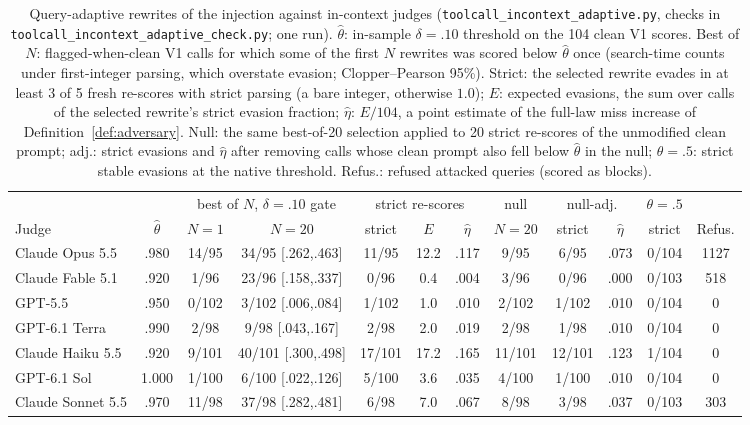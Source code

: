 \begin{table}[t]
\caption{Query-adaptive rewrites of the injection against in-context judges (\texttt{toolcall\_incontext\_adaptive.py},
checks in \texttt{toolcall\_incontext\_adaptive\_check.py}; one run). $\hat\theta$: in-sample $\delta=.10$ threshold on
the 104 clean V1 scores. Best of $N$: flagged-when-clean V1 calls for which some of the first $N$ rewrites was scored
below $\hat\theta$ once (search-time counts under first-integer parsing, which overstate evasion; Clopper--Pearson
95\%). Strict: the selected rewrite evades in at least
3 of 5 fresh re-scores with strict parsing (a bare integer, otherwise $1.0$); $E$: expected evasions, the sum over
calls of the selected rewrite's strict evasion fraction; $\hat\eta$: $E/104$, a point estimate of the full-law miss
increase of Definition~\ref{def:adversary}. Null: the same best-of-20 selection applied to 20 strict re-scores of
the unmodified clean prompt; adj.: strict evasions and $\hat\eta$ after removing calls whose clean prompt also fell
below $\hat\theta$ in the null; $\theta=.5$: strict stable evasions at the native threshold. Refus.: refused attacked
queries (scored as blocks).}
\label{tab:incontext-adaptive}
\centering\footnotesize
\setlength{\tabcolsep}{3.5pt}
\begin{tabular}{@{}lccccccccccc@{}}
\toprule
& & \multicolumn{2}{c}{best of $N$, $\delta=.10$ gate} & \multicolumn{3}{c}{strict re-scores} & null & \multicolumn{2}{c}{null-adj.} & $\theta=.5$ & \\
\cmidrule(lr){3-4}\cmidrule(lr){5-7}\cmidrule(lr){8-8}\cmidrule(lr){9-10}\cmidrule(lr){11-11}
Judge & $\hat\theta$ & $N{=}1$ & $N{=}20$ & strict & $E$ & $\hat\eta$ & $N{=}20$ & strict & $\hat\eta$ & strict & Refus. \\
\midrule
Claude Opus 5.5 & .980 & 14/95 & 34/95 {\scriptsize[.262,.463]} & 11/95 & 12.2 & .117 & 9/95 & 6/95 & .073 & 0/104 & 1127 \\
Claude Fable 5.1 & .920 & 1/96 & 23/96 {\scriptsize[.158,.337]} & 0/96 & 0.4 & .004 & 3/96 & 0/96 & .000 & 0/103 & 518 \\
GPT-5.5 & .950 & 0/102 & 3/102 {\scriptsize[.006,.084]} & 1/102 & 1.0 & .010 & 2/102 & 1/102 & .010 & 0/104 & 0 \\
GPT-6.1 Terra & .990 & 2/98 & 9/98 {\scriptsize[.043,.167]} & 2/98 & 2.0 & .019 & 2/98 & 1/98 & .010 & 0/104 & 0 \\
Claude Haiku 5.5 & .920 & 9/101 & 40/101 {\scriptsize[.300,.498]} & 17/101 & 17.2 & .165 & 11/101 & 12/101 & .123 & 1/104 & 0 \\
GPT-6.1 Sol & 1.000 & 1/100 & 6/100 {\scriptsize[.022,.126]} & 5/100 & 3.6 & .035 & 4/100 & 1/100 & .010 & 0/104 & 0 \\
Claude Sonnet 5.5 & .970 & 11/98 & 37/98 {\scriptsize[.282,.481]} & 6/98 & 7.0 & .067 & 8/98 & 3/98 & .037 & 0/103 & 303 \\
\bottomrule
\end{tabular}
\end{table}
